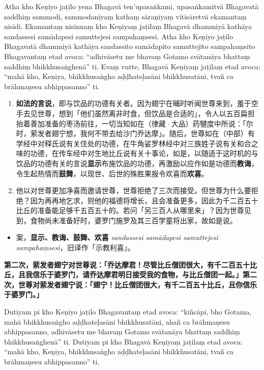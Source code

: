 Atha kho Keṇiyo jaṭilo yena Bhagavā ten’upasaṅkami, upasaṅkamitvā Bhagavatā saddhiṃ sammodi, sammodanīyaṃ kathaṃ sāraṇīyaṃ vītisāretvā ekamantaṃ nisīdi. Ekamantaṃ nisinnaṃ kho Keṇiyaṃ jaṭilaṃ Bhagavā dhammiyā kathāya sandassesi samādapesi samuttejesi sampahaṃsesi. Atha kho Keṇiyo jaṭilo Bhagavatā dhammiyā kathāya sandassito samādapito samuttejito sampahaṃsito Bhagavantaṃ etad avoca: “adhivāsetu me bhavaṃ Gotamo svātanāya bhattaṃ saddhiṃ bhikkhusaṅghenā” ti. Evaṃ vutte, Bhagavā Keṇiyaṃ jaṭilaṃ etad avoca: “mahā kho, Keṇiya, bhikkhusaṅgho aḍḍhateḷasāni bhikkhusatāni, tvañ ca brāhmaṇesu abhippasanno” ti.

\begin{enumerate}\item \textbf{如法的言说}，即与饮品的功德有关者。因为翅宁在晡时听闻世尊来到，羞于空手去见世尊，想到「他们虽然离非时食，但饮品是合适的」，令人以五百扁担抬着善加准备的枣汤前往，一切当知如在（律藏·大品）药犍度中所说：「尔时，萦发者翅宁想，我何不带去给沙门乔达摩」。随后，世尊如在（中部）有学经中对释氏说有关住处的功德，在牛角娑罗林经中对三族姓子说有关和合之味的功德，在传车经中对生地比丘说有关十事论，如是，以随适于这时机的与饮品的功德有关的言说\textbf{显示}布施饮品的功德，再激励以应作如是功德而\textbf{教诲}，令生起热情而\textbf{鼓舞}，以现世、后世的殊胜果报令欢喜而\textbf{欢喜}。
\item 他以对世尊更加净喜而邀请世尊，世尊拒绝了三次而接受。但世尊为什么要拒绝？因为再再地乞求，则他的福德将增长，且会准备更多，因此为千二百五十比丘的准备能足够千五百五十的。若问「另三百人从哪里来」？因为世尊见到，食物尚未准备好时，婆罗门施罗及其三百学童将出家，故如是说。\end{enumerate}

\begin{itemize}\item 案，\textbf{显示、教诲、鼓舞、欢喜} \textit{sandassesi samādapesi samuttejesi sampahaṃsesi}，旧译作「示教利喜」。\end{itemize}

\textbf{第二次，萦发者翅宁对世尊说：「乔达摩君！尽管比丘僧团很大，有千二百五十比丘，且我信乐于婆罗门，请乔达摩君明日接受我的食物，与比丘僧团一起。」第二次，世尊对萦发者翅宁说：「翅宁！比丘僧团很大，有千二百五十比丘，且你信乐于婆罗门。」}

Dutiyam pi kho Keṇiyo jaṭilo Bhagavantaṃ etad avoca: “kiñcāpi, bho Gotama, mahā bhikkhusaṅgho aḍḍhateḷasāni bhikkhusatāni, ahañ ca brāhmaṇesu abhippasanno, adhivāsetu me bhavaṃ Gotamo svātanāya bhattaṃ saddhiṃ bhikkhusaṅghenā” ti. Dutiyam pi kho Bhagavā Keṇiyaṃ jaṭilaṃ etad avoca: “mahā kho, Keṇiya, bhikkhusaṅgho aḍḍhateḷasāni bhikkhusatāni, tvañ ca brāhmaṇesu abhippasanno” ti.

